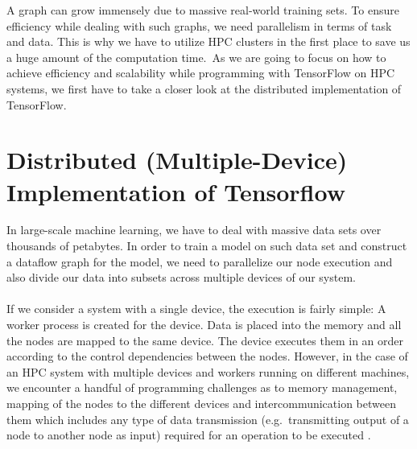 \documentclass[ieeetran]{article}
\begin{document}
\addtocounter{footnote}{-2}

\hspace{-0.51cm}A graph can grow immensely due to massive real-world training sets. To ensure efficiency while dealing with such graphs, we need parallelism in terms of task and data. This is why we have to utilize HPC clusters in the first place to save us a huge amount of the computation time.\ As we are going to focus on how to achieve efficiency and scalability while programming with TensorFlow on HPC systems, we first have to take a closer look at the distributed implementation of TensorFlow.


\section{Distributed (Multiple-Device) Implementation of Tensorflow} %
\label{sec:multiple_device_execution_of_a_graph}
In large-scale machine learning, we have to deal with massive data sets over thousands of petabytes. In order to train a model on such data set and construct a dataflow graph for the model, we need to parallelize our node execution and also divide our data into subsets across multiple devices of our system.
\\ \\If we consider a system with a single device, the execution is fairly simple: A worker process is created for the device. Data is placed into the memory and all the nodes are mapped to the same device. The device executes them in an order according to the control dependencies between the nodes. However, in the case of an HPC system with multiple devices and workers running on different machines, we encounter a handful of programming challenges as to memory management, mapping of the nodes to the different devices and intercommunication between them which includes any type of data transmission (e.g.\ transmitting output of a node to another node as input) required for an operation to be executed \cite{first}.
\end{document}
